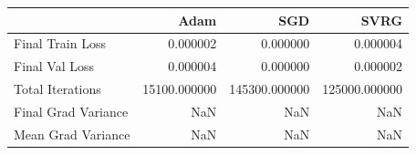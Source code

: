 
\begin{tabular}{lrrr}
\toprule
 & Adam & SGD & SVRG \\
\midrule
Final Train Loss & 0.000002 & 0.000000 & 0.000004 \\
Final Val Loss & 0.000004 & 0.000000 & 0.000002 \\
Total Iterations & 15100.000000 & 145300.000000 & 125000.000000 \\
Final Grad Variance & NaN & NaN & NaN \\
Mean Grad Variance & NaN & NaN & NaN \\
\bottomrule
\end{tabular}
